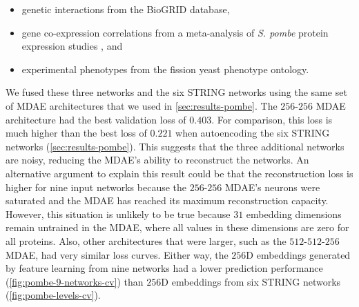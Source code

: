 \begin{itemize}
    \item genetic interactions from the BioGRID database,
    \item gene co-expression correlations from a meta-analysis of \emph{S. pombe} protein expression studies \cite{Pancaldi2010}, and
    \item experimental phenotypes from the fission yeast phenotype ontology.
\end{itemize}

We fused these three networks and the six STRING networks using the same set of MDAE architectures that we used in \ref{sec:results-pombe}.
The $256$-$256$ MDAE architecture had the best validation loss of $0.403$. For comparison, this loss is much higher than the best loss of $0.221$ when autoencoding the six STRING networks (\ref{sec:results-pombe}). This suggests that the three additional networks are noisy,
reducing the MDAE's ability to reconstruct the networks.
An alternative argument to explain this result could be that the reconstruction loss is higher for nine input networks because the $256$-$256$ MDAE's neurons were saturated and the MDAE has reached its maximum reconstruction capacity.
However, this situation is unlikely to be true because $31$ embedding dimensions remain untrained in the MDAE, where all values in these dimensions are zero for all proteins.
Also, other architectures that were larger, such as the $512$-$512$-$256$ MDAE, had very similar loss curves.
Either way, the $256$D embeddings generated by feature learning from nine networks had a lower prediction performance (\ref{fig:pombe-9-networks-cv}) than $256$D embeddings from six STRING networks (\ref{fig:pombe-levels-cv}).



